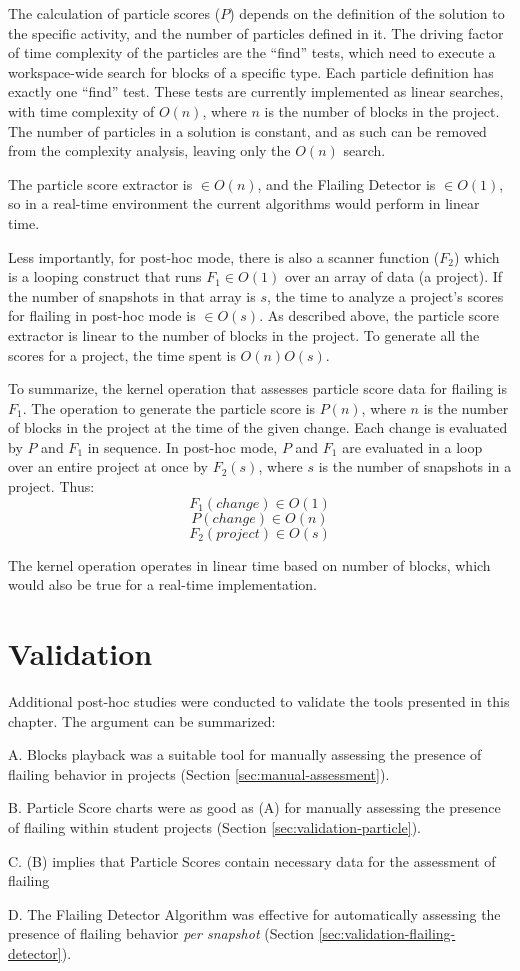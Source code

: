 The calculation of particle scores ($P$) depends on the definition of the solution to the specific activity, and the number of particles defined in it. The driving factor of time complexity of the particles are the ``find'' tests, which need to execute a workspace-wide search for blocks of a specific type. Each particle definition has exactly one ``find'' test. These tests are currently implemented as linear searches, with time complexity of $O(n)$, where $n$ is the number of blocks in the project. The number of particles in a solution is constant, and as such can be removed from the complexity analysis, leaving only the $O(n)$ search.

The particle score extractor is $\in O(n)$, and the Flailing Detector is $\in O(1)$, so in a real-time environment the current algorithms would perform in linear time. 

Less importantly, for post-hoc mode, there is also a scanner function ($F_2$) which is a looping construct that runs $F_1 \in O(1)$ over an array of data (a project). If the number of snapshots in that array is $s$, the time to analyze a project's scores for flailing in post-hoc mode is $\in O(s)$. As described above, the particle score extractor is linear to the number of blocks in the project. To generate all the scores for a project, the time spent is $O(n)O(s)$. 

To summarize, the kernel operation that assesses particle score data for flailing is $F_1$. The operation to generate the particle score is $P(n)$, where $n$ is the number of blocks in the project at the time of the given change. Each change is evaluated by $P$ and $F_1$ in sequence. In post-hoc mode, $P$ and $F_1$ are evaluated in a loop over an entire project at once by $F_2(s)$, where $s$ is the number of snapshots in a project. Thus:
\[F_1(change) \in O(1)\]
\[P(change) \in O(n)\]
\[F_2(project) \in O(s)\]

The kernel operation operates in linear time based on number of blocks, which would also be true for a real-time implementation.


\section{Validation}
Additional post-hoc studies were conducted to validate the tools presented in this chapter. The argument can be summarized:
\begin{description}
\item A. Blocks playback was a suitable tool for manually assessing the presence of flailing behavior in projects (Section \ref{sec:manual-assessment}). 
\item B. Particle Score charts were as good as (A) for manually assessing the presence of flailing within student projects (Section \ref{sec:validation-particle}).
\item C. (B) implies that Particle Scores contain necessary data for the assessment of flailing
\item D. The Flailing Detector Algorithm was effective for automatically assessing the presence of flailing behavior \emph{per snapshot} (Section \ref{sec:validation-flailing-detector}).
\end{description}

